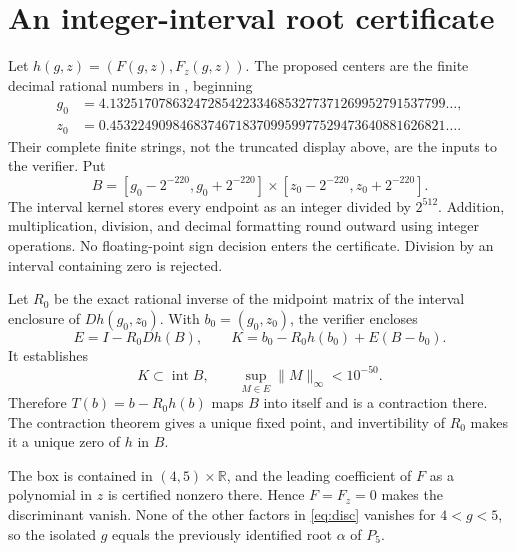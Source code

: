 \documentclass[11pt,letterpaper]{article}
\newcommand{\R}{\mathbb R}\newcommand{\Q}{\mathbb Q}
\newcommand{\code}[1]{\texttt{\detokenize{#1}}}
\begin{document}
\section{An integer-interval root certificate}\label{sec:interval}
Let $h(g,z)=(F(g,z),F_z(g,z))$. The proposed centers are the finite decimal rational numbers in \code{data/root_centers.json}, beginning
\begin{align*}
 g_0&=4.132517078632472854223346853277371269952791537799\ldots,\\
 z_0&=0.453224909846837467183709959977529473640881626821\ldots.
\end{align*}
Their complete finite strings, not the truncated display above, are the inputs to the verifier. Put
\[
 B=[g_0-2^{-220},g_0+2^{-220}]
       \times[z_0-2^{-220},z_0+2^{-220}].
\]
The interval kernel stores every endpoint as an integer divided by $2^{512}$. Addition, multiplication, division, and decimal formatting round outward using integer operations. No floating-point sign decision enters the certificate. Division by an interval containing zero is rejected.

Let $R_0$ be the exact rational inverse of the midpoint matrix of the interval enclosure of $Dh(g_0,z_0)$. With $b_0=(g_0,z_0)$, the verifier encloses
\[
 E=I-R_0Dh(B),\qquad
 K=b_0-R_0h(b_0)+E(B-b_0).
\]
It establishes
\[
              K\subset\operatorname{int}B,
       \qquad \sup_{M\in E}\lVert M\rVert_\infty<10^{-50}.
\]
Therefore $T(b)=b-R_0h(b)$ maps $B$ into itself and is a contraction there. The contraction theorem gives a unique fixed point, and invertibility of $R_0$ makes it a unique zero of $h$ in $B$.

The box is contained in $(4,5)\times\R$, and the leading coefficient of $F$ as a polynomial in $z$ is certified nonzero there. Hence $F=F_z=0$ makes the discriminant vanish. None of the other factors in \eqref{eq:disc} vanishes for $4<g<5$, so the isolated $g$ equals the previously identified root $\alpha$ of $P_5$.
\end{document}
